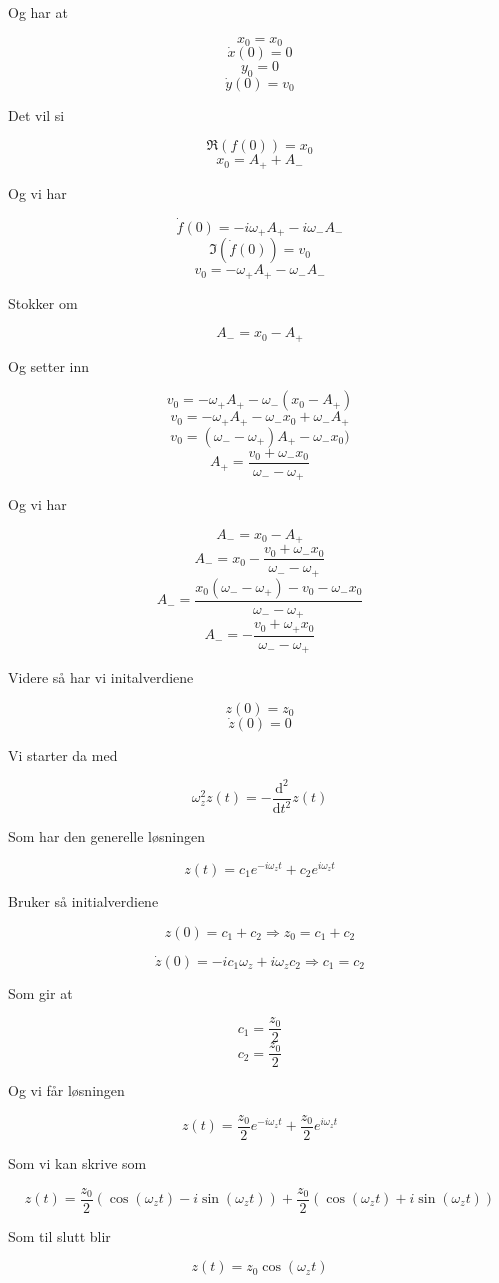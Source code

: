 \documentclass[reprint,english,notitlepage, nofootinbib]{revtex4-1}  %
\begin{document}
Og har at

$$x_0 = x_0$$
$$\dot{x}(0) = 0$$
$$y_0 = 0$$
$$\dot{y}(0) = v_0$$

Det vil si

$$\Re(f(0)) = x_0$$
$$x_0 = A_+ + A_-$$

Og vi har

$$\dot{f}(0) = -i\omega_+A_+ - i\omega_-A_-$$
$$\Im(\dot{f}(0)) = v_0$$
$$v_0 = -\omega_+A_+ - \omega_-A_-$$

Stokker om

$$A_- = x_0 - A_+$$

Og setter inn

$$v_0 = -\omega_+A_+-\omega_-(x_0-A_+)$$
$$v_0 = -\omega_+A_+-\omega_-x_0+\omega_-A_+$$
$$v_0 = (\omega_--\omega_+)A_+ - \omega_-x_0)$$
$$A_+ = \frac{v_0+\omega_-x_0}{\omega_--\omega_+}$$

Og vi har

$$A_- = x_0 - A_+$$
$$A_- = x_0 - \frac{v_0+\omega_-x_0}{\omega_--\omega_+}$$
$$A_- = \frac{x_0(\omega_--\omega_+)-v_0-\omega_-x_0}{\omega_--\omega_+}$$
$$A_- = -\frac{v_0+\omega_+x_0}{\omega_--\omega_+}$$

Videre så har vi initalverdiene

$$z(0) = z_0$$
$$\dot{z}(0) = 0$$

Vi starter da med

$$\omega_z^2z(t) = -\frac{\mathrm{d}^2}{\mathrm{d}t^2} z(t)$$

Som har den generelle løsningen

$$z(t) = c_1e^{-i\omega_zt} + c_2e^{i\omega_zt}$$

Bruker så initialverdiene

$$z(0) = c_1 + c_2 \Rightarrow z_0 = c_1 + c_2$$

$$\dot{z}(0) = -ic_1\omega_z + i\omega_zc_2 \Rightarrow c_1 = c_2$$

Som gir at

$$c_1 = \frac{z_0}{2}$$
$$c_2 = \frac{z_0}{2}$$

Og vi får løsningen

$$z(t) = \frac{z_0}{2}e^{-i\omega_zt} + \frac{z_0}{2}e^{i\omega_zt}$$

Som vi kan skrive som

$$z(t) = \frac{z_0}{2}(\cos{(\omega_zt) - i\sin{(\omega_zt)}}) +  \frac{z_0}{2}(\cos{(\omega_zt) + i\sin{(\omega_zt)}})$$

Som til slutt blir

$$z(t) = z_0 \cos{(\omega_zt)}$$



\clearpage
\end{document}
